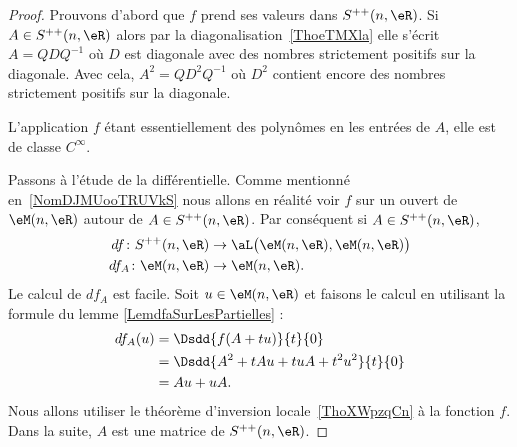 \begin{proof}
    Prouvons d'abord que \( f\) prend ses valeurs dans \( S^{++}(n,\eR)\). Si \( A\in S^{++}(n,\eR)\) alors par la diagonalisation~\ref{ThoeTMXla} elle s'écrit \( A=QDQ^{-1}\) où \( D\) est diagonale avec des nombres strictement positifs sur la diagonale. Avec cela, \( A^2=QD^2Q^{-1}\) où \( D^2\) contient encore des nombres strictement positifs sur la diagonale.

    L'application \( f\) étant essentiellement des polynômes en les entrées de \( A\), elle est de classe \( C^{\infty}\).

    Passons à l'étude de la différentielle. Comme mentionné en~\ref{NomDJMUooTRUVkS} nous allons en réalité voir \( f\) sur un ouvert de \( \eM(n,\eR)\) autour de \( A\in S^{++}(n,\eR)\). Par conséquent si \( A\in S^{++}(n,\eR)\),
    \begin{subequations}
        \begin{align}
            df\colon S^{++}(n,\eR)&\to \aL\big( \eM(n,\eR),\eM(n,\eR) \big)\\
            df_A\colon \eM(n,\eR)&\to \eM(n,\eR).
        \end{align}
    \end{subequations}
    Le calcul de \( df_A\) est facile. Soit \( u\in \eM(n,\eR)\) et faisons le calcul en utilisant la formule du lemme \eqref{LemdfaSurLesPartielles} :
    \begin{subequations}
        \begin{align}
            df_A(u)&=\Dsdd{ f(A+tu) }{t}{0}\\
            &=\Dsdd{ A^2+tAu+tuA+t^2u^2 }{t}{0}\\
            &=Au+uA.
        \end{align}
    \end{subequations}
    Nous allons utiliser le théorème d'inversion locale~\ref{ThoXWpzqCn} à la fonction \( f\). Dans la suite, \( A\) est une matrice de \( S^{++}(n,\eR)\).


\end{proof}
